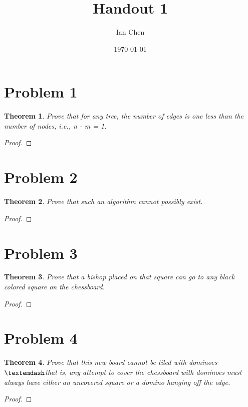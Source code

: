 \documentclass[11pt]{article}
\title{Handout 1}
\author{Ian Chen}
\date{\today}
\begin{document}
    \maketitle

    \setcounter{section}{0} %


    \section{Problem 1}\label{sec:chapter_1}

    \newtheorem{theorem}{Theorem}
    \newtheorem{exercise}[theorem]{Exercise}
    \newtheorem{corollary}[theorem]{Corollary}
    \newtheorem{question}[theorem]{Question}
    \newtheorem{lemma}[theorem]{Lemma}

    \setcounter{theorem}{0} %

    \begin{theorem}
        Prove that for any tree, the number of edges is one less than the number of nodes, i.e., n
        - m = 1.
    \end{theorem}
    \begin{proof}
    \end{proof}


    \section{Problem 2}\label{sec:chapter_2}

    \begin{theorem}
        Prove that such an algorithm cannot possibly exist.
    \end{theorem}
    \begin{proof}
    \end{proof}


    \section{Problem 3}\label{sec:chapter_3}

    \begin{theorem}
        Prove that a bishop placed on that square can go to any black colored square on the
        chessboard.
    \end{theorem}
    \begin{proof}
    \end{proof}


    \section{Problem 4}\label{sec:chapter_4}

    \begin{theorem}
        Prove that this new board cannot be tiled with dominoes$\textemdash$that is, any attempt to
        cover the chessboard with dominoes must always have either an uncovered square or a
        domino hanging off the edge.
    \end{theorem}
    \begin{proof}
    \end{proof}
\end{document}
